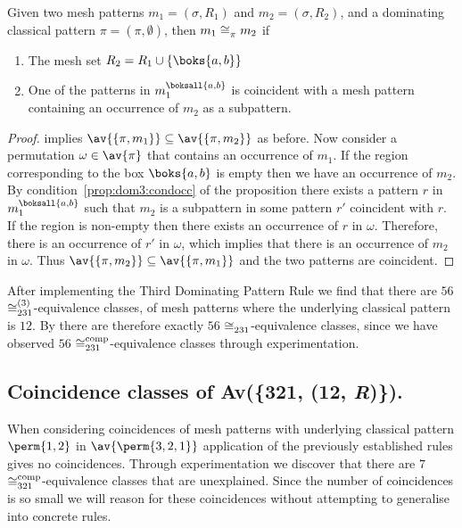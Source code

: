 \begin{proposition}
    \label{prop:dom3}
    Given two mesh patterns \(m_1 =(\sigma, R_1)\) and \(m_2 = (\sigma, R_2)\),
    and a dominating classical pattern \(\pi = (\pi,\emptyset)\), then
    \(m_1 \coinc{\pi} m_2\) if
    \begin{enumerate}
        \item The mesh set \(R_2 = R_1 \cup \{\boks{a,b}\}\)
        \item\label{prop:dom3:condocc} One of the patterns in \(m_1^\boksall{a,b}\)
            is coincident with a mesh pattern containing an occurrence of
            \(m_2\) as a subpattern.
    \end{enumerate}
\end{proposition}
\begin{proof}
     implies \(\av{\{\pi,m_1\}} \subseteq \av{\{\pi,m_2\}}\)
as before. Now consider a permutation \(\omega \in \av{\pi}\) that contains an
occurrence of \(m_1\). If the region corresponding to the box \(\boks{a,b}\) is
empty then we have an occurrence of \(m_2\). By
condition~\ref{prop:dom3:condocc} of the proposition there exists a pattern
\(r\) in \(m_1^\boksall{a,b}\) such that \(m_2\) is a subpattern in some pattern
\(r'\) coincident with \(r\). If the region is non-empty then there exists an
occurrence of \(r\) in \(\omega\). Therefore, there is an occurrence of \(r'\) in
\(\omega\), which implies that there is an occurrence of \(m_2\) in \(\omega\).
Thus \(\av{\{\pi,m_2\}} \subseteq \av{\{\pi,m_1\}}\) and the two patterns are
coincident.
\end{proof}

After implementing the Third Dominating Pattern Rule we find that there are
\(56\) \(\coinc[(3)]{231}\)-equivalence classes, of mesh patterns where the
underlying classical pattern is \(12\). By  there are
therefore exactly \(56\) \(\coinc{231}\)-equivalence classes, since we have
observed \(56\) \(\coinc[comp]{231}\)-equivalence classes through
experimentation.

\subsection{Coincidence classes of Av(\{321, (12, \textit{R})\}).}
When considering coincidences of mesh patterns with underlying classical pattern
\(\perm{1,2}\) in \(\av{\perm{3,2,1}}\) application of the previously
established rules gives no coincidences. Through experimentation we discover
that there are \(7\) \(\coinc[comp]{321}\)-equivalence classes that are
unexplained. Since the number of coincidences is so small we will reason for
these coincidences without attempting to generalise into concrete rules.

